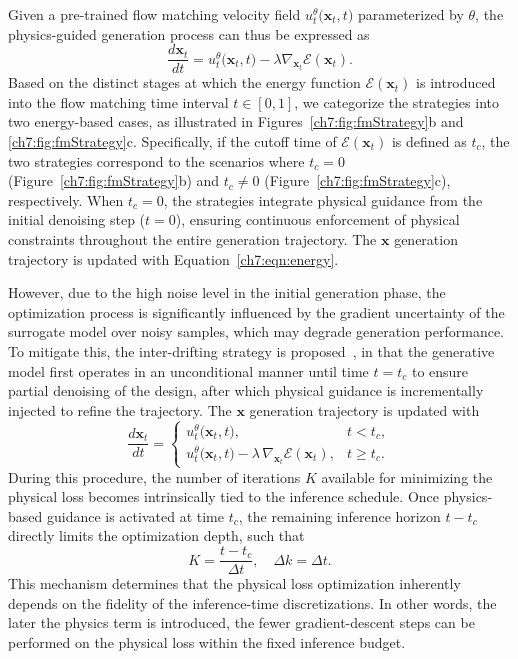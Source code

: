 Given a pre-trained flow matching velocity field $u_t^{\theta}\bigl(\mathbf{x}_t, t\bigr)$ parameterized by $\theta$, the physics-guided generation process can thus be expressed as 
\begin{equation}
    \frac{d \mathbf{x}_t}{d t} = u_t^{\theta}\bigl(\mathbf{x}_t, t\bigr) - \lambda \nabla_{\mathbf{x}_t} \mathcal{E}\left(\mathbf{x}_t\right).
\label{ch7:eqn:energy}
\end{equation} 
Based on the distinct stages at which the energy function $\mathcal{E}\left(\mathbf{x}_t\right)$ is introduced into the flow matching time interval $t \in [0,1]$, we categorize the strategies into two energy-based cases, as illustrated in Figures~\ref{ch7:fig:fmStrategy}b and \ref{ch7:fig:fmStrategy}c. Specifically, if the cutoff time of $\mathcal{E}\left(\mathbf{x}_t\right)$ is defined as $t_c$, the two strategies correspond to the scenarios where $t_c = 0$ (Figure~\ref{ch7:fig:fmStrategy}b) and $t_c \neq 0$ (Figure~\ref{ch7:fig:fmStrategy}c), respectively. When $t_c = 0$, the strategies integrate physical guidance from the initial denoising step ($t=0$), ensuring continuous enforcement of physical constraints throughout the entire generation trajectory. The $\mathbf{x}$ generation trajectory is updated with Equation~\ref{ch7:eqn:energy}.

However, due to the high noise level in the initial generation phase, the optimization process is significantly influenced by the gradient uncertainty of the surrogate model over noisy samples, which may degrade generation performance. To mitigate this, the inter-drifting strategy is proposed~\cite{aa.Maze2023,aa.Giannone2023}, in that the generative model first operates in an unconditional manner until time $t=t_c$ to ensure partial denoising of the design, after which physical guidance is incrementally injected to refine the trajectory. The $\mathbf{x}$ generation trajectory is updated with
\begin{equation}
\frac{d\mathbf{x}_t}{dt}
=
\begin{cases}
u_t^{\theta}\bigl(\mathbf{x}_t, t\bigr), 
& t < t_c, \\[6pt]
u_t^{\theta}\bigl(\mathbf{x}_t, t\bigr)
- \lambda\,\nabla_{\mathbf{x}_t}\mathcal{E}(\mathbf{x}_t), 
& t \ge t_c.
\end{cases}
\end{equation}
During this procedure, the number of iterations $K$ available for minimizing the physical loss becomes intrinsically tied to the inference schedule. Once physics‐based guidance is activated at time $t_c$, the remaining inference horizon $t - t_c$ directly limits the optimization depth, such that
\begin{equation}
    K = \frac{t - t_c}{\Delta t}, \quad \Delta k = \Delta t.
\end{equation}
This mechanism determines that the physical loss optimization inherently depends on the fidelity of the inference-time discretizations. In other words, the later the physics term is introduced, the fewer gradient-descent steps can be performed on the physical loss within the fixed inference budget.

